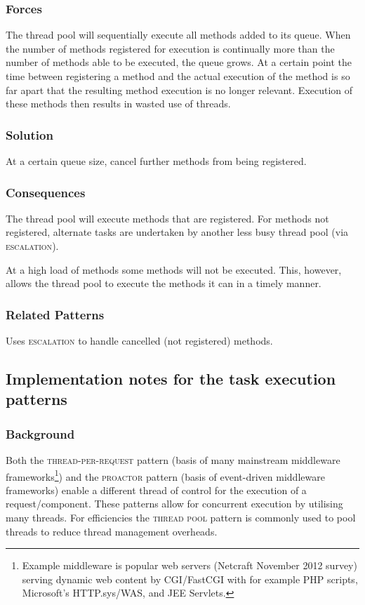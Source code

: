 \documentclass[prodmode]{style/acmlarge}
\begin{document}
\subsubsection*{Forces} The thread pool will sequentially execute all methods
added to its queue.  When the number of methods registered for execution is
continually more than the number of methods able to be executed, the queue
grows.  At a certain point the time between registering a method and the actual
execution of the method is so far apart that the resulting method execution is
no longer relevant.  Execution of these methods then results in wasted use of
threads.

\subsubsection*{Solution} At a certain queue size, cancel further methods from
being registered.

\subsubsection*{Consequences} The thread pool will execute methods that are
registered. For methods not registered, alternate tasks are undertaken by
another less busy thread pool (via \textsc{escalation}).

At a high load of methods some methods will not be executed.  This, however,
allows the thread pool to execute the methods it can in a timely manner.

\subsubsection*{Related Patterns} Uses \textsc{escalation} to handle cancelled
(not registered) methods.



\subsection{Implementation notes for the task execution patterns}

\subsubsection*{Background}

Both the \textsc{thread-per-request} pattern \cite{thread-per-request} (basis of
many mainstream middleware frameworks\footnote{Example middleware is popular web
servers (Netcraft November 2012 survey) serving dynamic web content by
CGI/FastCGI with for example PHP scripts, Microsoft's HTTP.sys/WAS, and JEE
Servlets.}) and the \textsc{proactor} pattern \cite{proactor} (basis of
event-driven middleware frameworks) enable a different thread of control for the
execution of a request/component.  These patterns allow for concurrent execution
by utilising many threads.  For efficiencies the \textsc{thread pool} pattern
\cite{thread-per-request} is commonly used to pool threads to reduce thread
management overheads.
\end{document}
